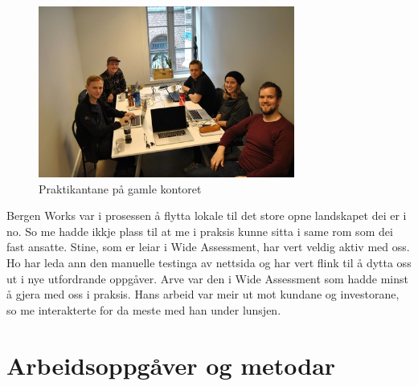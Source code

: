 \documentclass[12pt]{article}
\begin{document}
\begin{figure}[!h]
  \includegraphics[width=0.75\textwidth]{Studenter}
  \centering
  \caption{Praktikantane på gamle kontoret}
  \label{fig:praktikantar1}
\end{figure}

Bergen Works var i prosessen å flytta lokale
til det store opne landskapet dei er i no. So me hadde ikkje plass til at me i
praksis kunne sitta i same rom som dei fast ansatte.
Stine, som er leiar i Wide Assessment, har vert veldig aktiv med oss. Ho har leda
ann den manuelle testinga av nettsida og har vert flink til å dytta oss ut i nye
utfordrande oppgåver. Arve var den i Wide Assessment som hadde minst å gjera med
oss i praksis. Hans arbeid var meir ut mot kundane og investorane, so me interakterte
for da meste med han under lunsjen.

\section{Arbeidsoppgåver og metodar}
\end{document}
